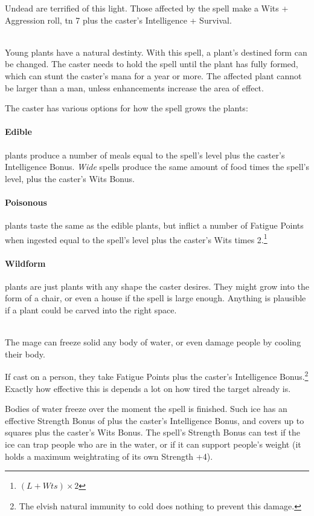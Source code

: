 \begin{multicols}{2}
Undead are terrified of this light.
Those affected by the spell make a Wits + Aggression roll, \gls{tn} 7 plus the caster's Intelligence + Survival.

\\
Young plants have a natural destinty.
With this spell, a plant's destined form can be changed.
The caster needs to hold the spell until the plant has fully formed, which can stunt the caster's mana for a year or more.
The affected plant cannot be larger than a man, unless enhancements increase the area of effect.

The caster has various options for how the spell grows the plants:

\paragraph{Edible} plants produce a number of meals equal to the spell's level plus the caster's Intelligence Bonus.
\textit{Wide} spells produce the same amount of food times the spell's level, plus the caster's Wits Bonus.

\paragraph{Poisonous} plants taste the same as the edible plants, but inflict a number of Fatigue Points when ingested equal to the spell's level plus the caster's Wits times 2.\footnote{$(L + Wts)\times 2$}

\paragraph{Wildform} plants are just plants with any shape the caster desires.
They might grow into the form of a chair, or even a house if the spell is large enough.
Anything is plausible if a plant could be carved into the right space.

\\
The mage can freeze solid any body of water, or even damage people by cooling their body.

If cast on a person, they take  Fatigue Points plus the caster's Intelligence Bonus.\footnote{The elvish natural immunity to cold does nothing to prevent this damage.}
Exactly how effective this is depends a lot on how tired the target already is.

Bodies of water freeze over the moment the spell is finished.
Such ice has an effective Strength Bonus of  plus the caster's Intelligence Bonus, and covers up to  squares plus the caster's Wits Bonus.
The spell's Strength Bonus can test if the ice can trap people who are in the water, or if it can support people's weight (it holds a maximum \gls{weightrating} of its own Strength +4).


\end{multicols}
